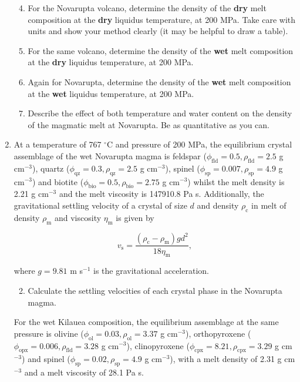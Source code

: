 \documentclass[]{book}
\theoremstyle{definition}
\begin{document}
\begin{enumerate}
  \begin{enumerate}\setcounter{enumii}{3}
  \item For the Novarupta volcano, determine the density of the \textbf{dry} melt composition at the \textbf{dry} liquidus temperature, at 200 MPa. Take care with units and show your method clearly (it may be helpful to draw a table). 
  \item For the same volcano, determine the density of the \textbf{wet} melt composition at the \textbf{dry} liquidus temperature, at 200 MPa.
  \item Again for Novarupta, determine the density of the \textbf{wet} melt composition at the \textbf{wet} liquidus temperature, at 200 MPa.
  \item Describe the effect of both temperature and water content on the density of the magmatic melt at Novarupta. Be as quantitative as you can.
  \end{enumerate}


\item At a temperature of 767 $^{\circ}$C and pressure of 200 MPa, the equilibrium crystal assemblage of the wet Novarupta magma is feldspar ($\phi_{\text{fld}} = 0.5, \rho_{\text{fld}} = 2.5$ g cm$^{-3}$), quartz ($\phi_{\text{qz}} = 0.3, \rho_{\text{qz}} = 2.5$ g cm$^{-3}$), spinel ($\phi_{\text{sp}} = 0.007, \rho_{\text{sp}} = 4.9$ g cm$^{-3}$) and biotite ($\phi_{\text{bio}} = 0.5, \rho_{\text{bio}} = 2.75$ g cm$^{-3}$) whilst the melt density is 2.21 g cm$^{-3}$ and the melt viscosity is 147910.8 Pa s. Additionally, the gravitational settling velocity of a crystal of size $d$ and density $\rho_{\text{c}}$ in melt of density $\rho_{\text{m}}$ and viscosity $\eta_{\text{m}}$ is given by

  \begin{equation}
    \label{equ:Stokes}
    v_{\text{s}} = \frac{(\rho_{\text{c}} - \rho_{\text{m}}) g d^{2}}{18 \eta_{\text{m}}},
  \end{equation}

  where $g = 9.81$ m s$^{-1}$ is the gravitational acceleration. 

  \begin{enumerate}
    \setcounter{enumi}{1}
  \item Calculate the settling velocities of each crystal phase in the Novarupta magma.
  \end{enumerate}

  For the wet Kilauea composition, the equilibrium assemblage at the same pressure is olivine ($\phi_{\text{ol}} = 0.03, \rho_{\text{ol}} = 3.37$ g cm$^{-3}$), orthopyroxene ($\phi_{\text{opx}} = 0.006, \rho_{\text{fld}} = 3.28$ g cm$^{-3}$), clinopyroxene ($\phi_{\text{cpx}} = 8.21, \rho_{\text{cpx}} = 3.29$ g cm$^{-3}$) and spinel ($\phi_{\text{sp}} = 0.02, \rho_{\text{sp}} = 4.9$ g cm$^{-3}$), with a melt density of 2.31 g cm$^{-3}$ and a melt viscosity of 28.1 Pa s. 


\end{enumerate}
\end{document}
